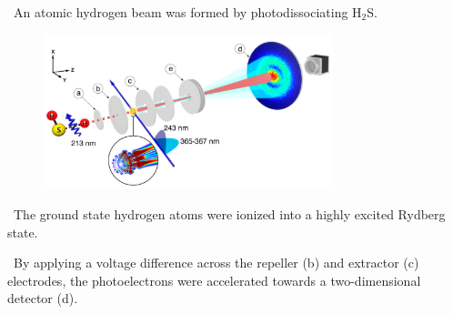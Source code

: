 \cmark\ An atomic hydrogen beam was formed by photodissociating H$_2$S.


\vspace{-8mm}

\begin{figure}[h]
    \centering
    \includegraphics[width=0.75\textwidth]{figures/2.png}
\end{figure}

\vspace{-4mm}

\cmark\ The ground state hydrogen atoms were ionized into a highly excited Rydberg state.

\cmark\ By applying a voltage difference across the repeller (b) and extractor (c) electrodes, the
photoelectrons were accelerated towards a two-dimensional detector (d).

